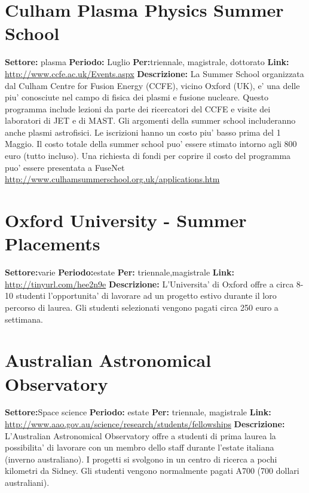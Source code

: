 \documentclass[a4paper,10pt]{article}
\begin{document}
\section{Culham Plasma Physics Summer School}
\textbf{Settore:} plasma \newline
\textbf{Periodo:} Luglio\newline
\textbf{Per:}triennale, magistrale, dottorato\newline
\textbf{Link:} \url{http://www.ccfe.ac.uk/Events.aspx} \newline
\textbf{Descrizione:}   La Summer School organizzata dal Culham Centre for Fusion Energy (CCFE), vicino Oxford (UK), e' una delle piu' conosciute nel campo di fisica dei plasmi e fusione nucleare. Questo programma include lezioni da parte dei ricercatori del CCFE e visite dei laboratori di JET e di MAST. Gli argomenti della summer school includeranno anche plasmi astrofisici. Le iscrizioni hanno un costo piu' basso prima del 1 Maggio. Il costo totale della summer school puo' essere stimato intorno agli 800 euro (tutto incluso). Una richiesta di fondi per coprire il costo del programma puo' essere presentata a FuseNet \url{http://www.culhamsummerschool.org.uk/applications.htm}  

\section{Oxford University - Summer Placements}
\textbf{Settore:}varie \newline
\textbf{Periodo:}estate \newline
\textbf{Per:} triennale,magistrale\newline
\textbf{Link:} \url{http://tinyurl.com/hee2n9e} \newline
\textbf{Descrizione:} L'Universita' di Oxford offre a circa 8-10 studenti l'opportunita' di lavorare ad un progetto estivo durante il loro percorso di laurea. Gli studenti selezionati vengono pagati circa 250 euro a settimana.  

\section{Australian Astronomical Observatory}
\textbf{Settore:}Space science \newline
\textbf{Periodo:} estate\newline
\textbf{Per:} triennale, magistrale\newline
\textbf{Link:} \url{http://www.aao.gov.au/science/research/students/fellowships} \newline
\textbf{Descrizione:} L'Australian Astronomical Observatory offre a studenti di prima laurea la possibilita' di lavorare con un membro dello staff durante l'estate italiana (inverno australiano). I progetti si svolgono in un centro di ricerca a pochi kilometri da Sidney. Gli studenti vengono normalmente pagati A700 (700 dollari australiani).   
\end{document}
